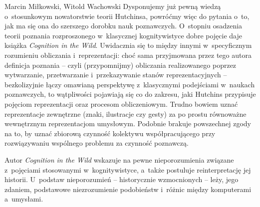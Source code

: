 \begin{artplenv2auth}{Marcin Miłkowski, Witold Wachowski}
Dysponujemy już pewną wiedzą o~stosunkowym nowatorstwie teorii Hutchinsa, powróćmy więc do pytania o~to, jak ma się ona do szerszego dorobku nauk poznawczych. O~stopniu osadzenia teorii poznania rozproszonego w~klasycznej kognitywistyce dobre pojęcie daje książka \textit{Cognition in the Wild}. Uwidacznia się to między innymi w~specyficznym rozumieniu obliczania i~reprezentacji: choć sama przyjmowana przez tego autora definicja poznania -- czyli (przypomnijmy) obliczania realizowanego poprzez wytwarzanie, przetwarzanie i~przekazywanie stanów reprezentacyjnych -- bezkolizyjnie łączy omawianą perspektywę z~klasycznymi podejściami w~naukach poznawczych, to wątpliwości pojawiają się co do zakresu, jaki Hutchins przypisuje pojęciom reprezentacji oraz procesom obliczeniowym. Trudno bowiem uznać reprezentacje zewnętrzne (znaki, ilustracje czy gesty) za po prostu równoważne wewnętrznym reprezentacjom umysłowym. Podobnie brakuje powszechnej zgody na to, by uznać zbiorową czynność kolektywu współpracującego przy rozwiązywaniu wspólnego problemu za czynność poznawczą.

Autor \textit{Cognition in the Wild} wskazuje na pewne nieporozumienia związane z~pojęciami stosowanymi w~kognitywistyce, a~także postuluje reinterpretację jej historii. U~podstaw nieporozumień -- historycznie wzmocnionych -- leży, jego zdaniem, podstawowe niezrozumienie podobieństw i~różnic między komputerami a~umysłami.


\end{artplenv2auth}

